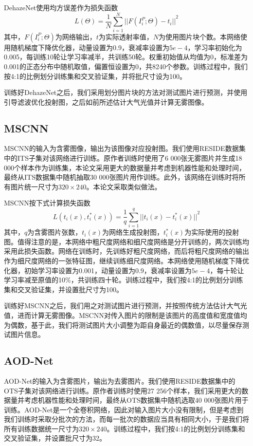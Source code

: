 \documentclass[a4paper, 12pt, oneside]{report}
\begin{document}
{DehazeNet使用均方误差作为损失函数
\begin{equation} \label{eq:4.2}
L(\Theta) = \frac{1}{N}\sum_{i = 1}^N {||F(I_i^P; \Theta) - t_i||}^2
\end{equation}
其中，$F(I_i^P; \Theta)$为网络输出，$t$为实际透射率值，$N$为使用图片块个数。本网络使用随机梯度下降优化器，动量设置为0.9，衰减率设置为$5e-4$，学习率初始化为0.005，每训练10轮让学习率减半，共训练50轮。权重初始值从均值为0，标准差为0.001的正态分布中随机取值，偏置恒设置为0，共8240个参数。训练过程中，我们按4:1的比例划分训练集和交叉验证集，并将批尺寸设为100。

训练好DehazeNet之后，我们采用划分图片块的方法对测试图片进行预测，并使用引导滤波优化投射图，之后如前所述估计大气光值并计算无雾图像。

\subsection{MSCNN\quad}
MSCNN的输入为含雾图像，输出为该图像对应投射图。我们使用RESIDE数据集中的ITS子集对该网络进行训练。原作者训练时使用了6 000张无雾图片并生成18 000个样本作为训练集，本论文采用更大的数据量并考虑到机器性能和处理时间，最终从ITS数据集中随机抽取30 000张图片用作训练。此外，该网络在训练时将所有图片统一尺寸为$320 \times 240$。本论文采取类似做法。

MSCNN按下式计算损失函数
\begin{equation} \label{eq:4.3}
L(t_i(x), t_i^{\ast}(x)) = \frac{1}{q}\sum_{i = 1}^q {||t_i(x) - t_i^{\ast}(x)||}^2
\end{equation}
其中，$q$为含雾图片张数，$t_i(x)$为网络生成投射图，$t_i^{\ast}(x)$为实际使用的投射图。值得注意的是，本网络中粗尺度网络和细尺度网络是分开训练的，两次训练均采用此损失函数。网络在训练时，先训练好粗尺度网络，而后将粗尺度网络的输出作为细尺度网络的一张特征图，继续训练细尺度网络。本网络使用随机梯度下降优化器，初始学习率设置为0.001，动量设置为0.9，衰减率设置为$5e-4$，每十轮让学习率减至原值的10\%，共训练四十轮。训练过程中，我们按4:1的比例划分训练集和交叉验证集，并设置批尺寸为100。

训练好MSCNN之后，我们用之对测试图片进行预测，并按照传统方法估计大气光值，进而计算无雾图像。MSCNN对传入图片的限制是该图片的高度值和宽度值均为偶数，基于此，我们将测试图片大小调整为距自身最近的偶数值，以尽量保存测试图片信息。

\subsection{AOD-Net\quad}
AOD-Net的输入为含雾图片，输出为去雾图片。我们使用RESIDE数据集中的OTS子集对该网络进行训练。原作者训练时使用27 256个样本，我们采用更大的数据量并考虑机器性能和处理时间，最终从OTS数据集中随机选取40 000张图片用于训练。AOD-Net是一个全卷积网络，因此对输入图片大小没有限制，但是考虑到我们训练时采取分批次的方法，而每一批次的数据应当具有相同大小，于是我们将所有训练数据统一尺寸为$320 \times 240$。训练过程中，我们按4:1的比例划分训练集和交叉验证集，并设置批尺寸为32。
	
}
\end{document}
